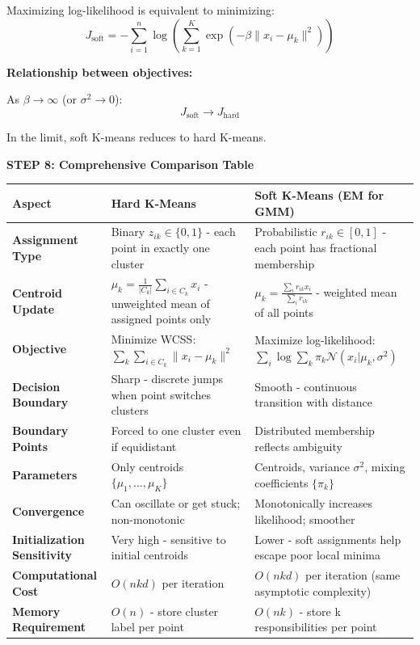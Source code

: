 \documentclass[12pt]{article}
\begin{document}
\begin{solution}
Maximizing log-likelihood is equivalent to minimizing:
\[
J_{\text{soft}} = -\sum_{i=1}^n \log \left( \sum_{k=1}^K \exp(-\beta\|x_i - \mu_k\|^2) \right)
\]

\textbf{Relationship between objectives:}

As $\beta \to \infty$ (or $\sigma^2 \to 0$):
\[
J_{\text{soft}} \to J_{\text{hard}}
\]

In the limit, soft K-means reduces to hard K-means.

\textbf{STEP 8: Comprehensive Comparison Table}

\begin{center}
\begin{tabular}{p{3cm}|p{5cm}|p{5cm}}
\textbf{Aspect} & \textbf{Hard K-Means} & \textbf{Soft K-Means (EM for GMM)} \\
\hline
\textbf{Assignment Type} & Binary $z_{ik} \in \{0,1\}$ - each point in exactly one cluster & Probabilistic $r_{ik} \in [0,1]$ - each point has fractional membership \\
\hline
\textbf{Centroid Update} & $\mu_k = \frac{1}{|C_k|}\sum_{i \in C_k} x_i$ - unweighted mean of assigned points only & $\mu_k = \frac{\sum_i r_{ik}x_i}{\sum_i r_{ik}}$ - weighted mean of all points \\
\hline
\textbf{Objective} & Minimize WCSS: $\sum_k \sum_{i \in C_k} \|x_i - \mu_k\|^2$ & Maximize log-likelihood: $\sum_i \log \sum_k \pi_k \mathcal{N}(x_i | \mu_k, \sigma^2)$ \\
\hline
\textbf{Decision Boundary} & Sharp - discrete jumps when point switches clusters & Smooth - continuous transition with distance \\
\hline
\textbf{Boundary Points} & Forced to one cluster even if equidistant & Distributed membership reflects ambiguity \\
\hline
\textbf{Parameters} & Only centroids $\{\mu_1, \ldots, \mu_K\}$ & Centroids, variance $\sigma^2$, mixing coefficients $\{\pi_k\}$ \\
\hline
\textbf{Convergence} & Can oscillate or get stuck; non-monotonic & Monotonically increases likelihood; smoother \\
\hline
\textbf{Initialization Sensitivity} & Very high - sensitive to initial centroids & Lower - soft assignments help escape poor local minima \\
\hline
\textbf{Computational Cost} & $O(nkd)$ per iteration & $O(nkd)$ per iteration (same asymptotic complexity) \\
\hline
\textbf{Memory Requirement} & $O(n)$ - store cluster label per point & $O(nk)$ - store k responsibilities per point \\

\end{tabular}
\end{center}
\end{solution}
\end{document}
